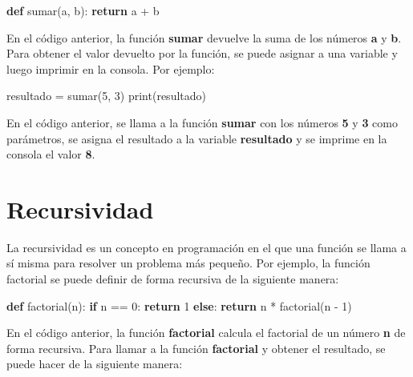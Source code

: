 \documentclass[
  a4paper,
  DIV=11,
  numbers=noendperiod,
  onepage,
  openany]{scrreprt}
\newenvironment{Shaded}{\begin{snugshade}}{\end{snugshade}}
\newcommand{\BuiltInTok}[1]{\textcolor[rgb]{0.00,0.23,0.31}{#1}}
\newcommand{\ControlFlowTok}[1]{\textcolor[rgb]{0.00,0.23,0.31}{\textbf{#1}}}
\newcommand{\DecValTok}[1]{\textcolor[rgb]{0.68,0.00,0.00}{#1}}
\newcommand{\KeywordTok}[1]{\textcolor[rgb]{0.00,0.23,0.31}{\textbf{#1}}}
\newcommand{\NormalTok}[1]{\textcolor[rgb]{0.00,0.23,0.31}{#1}}
\newcommand{\OperatorTok}[1]{\textcolor[rgb]{0.37,0.37,0.37}{#1}}
\begin{document}
\begin{Shaded}
\begin{Highlighting}[]
\KeywordTok{def}\NormalTok{ sumar(a, b):}
    \ControlFlowTok{return}\NormalTok{ a }\OperatorTok{+}\NormalTok{ b}
\end{Highlighting}
\end{Shaded}

En el código anterior, la función \textbf{sumar} devuelve la suma de los
números \textbf{a} y \textbf{b}. Para obtener el valor devuelto por la
función, se puede asignar a una variable y luego imprimir en la consola.
Por ejemplo:

\begin{Shaded}
\begin{Highlighting}[]
\NormalTok{resultado }\OperatorTok{=}\NormalTok{ sumar(}\DecValTok{5}\NormalTok{, }\DecValTok{3}\NormalTok{)}
\BuiltInTok{print}\NormalTok{(resultado)}
\end{Highlighting}
\end{Shaded}

En el código anterior, se llama a la función \textbf{sumar} con los
números \textbf{5} y \textbf{3} como parámetros, se asigna el resultado
a la variable \textbf{resultado} y se imprime en la consola el valor
\textbf{8}.

\section{Recursividad}\label{recursividad}

La recursividad es un concepto en programación en el que una función se
llama a sí misma para resolver un problema más pequeño. Por ejemplo, la
función factorial se puede definir de forma recursiva de la siguiente
manera:

\begin{Shaded}
\begin{Highlighting}[]
\KeywordTok{def}\NormalTok{ factorial(n):}
    \ControlFlowTok{if}\NormalTok{ n }\OperatorTok{==} \DecValTok{0}\NormalTok{:}
        \ControlFlowTok{return} \DecValTok{1}
    \ControlFlowTok{else}\NormalTok{:}
        \ControlFlowTok{return}\NormalTok{ n }\OperatorTok{*}\NormalTok{ factorial(n }\OperatorTok{{-}} \DecValTok{1}\NormalTok{)}
\end{Highlighting}
\end{Shaded}

En el código anterior, la función \textbf{factorial} calcula el
factorial de un número \textbf{n} de forma recursiva. Para llamar a la
función \textbf{factorial} y obtener el resultado, se puede hacer de la
siguiente manera:
\end{document}
